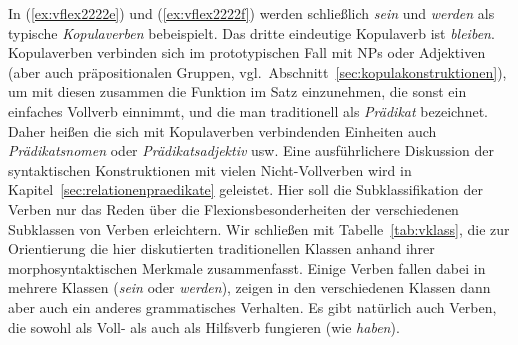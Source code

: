In (\ref{ex:vflex2222e}) und (\ref{ex:vflex2222f}) werden schließlich \textit{sein} und \textit{werden} als typische \textit{Kopulaverben} bebeispielt.
Das dritte eindeutige Kopulaverb ist \textit{bleiben}.
Kopulaverben verbinden sich im prototypischen Fall mit NPs oder Adjektiven (aber auch präpositionalen Gruppen, vgl.\ Abschnitt~\ref{sec:kopulakonstruktionen}), um mit diesen zusammen die Funktion im Satz einzunehmen, die sonst ein einfaches Vollverb einnimmt, und die man traditionell als \textit{Prädikat} bezeichnet.
Daher heißen die sich mit Kopulaverben verbindenden Einheiten auch \textit{Prädikatsnomen} oder \textit{Prädikatsadjektiv} usw.
Eine ausführlichere Diskussion der syntaktischen Konstruktionen mit vielen Nicht-Vollverben wird in Kapitel~\ref{sec:relationenpraedikate} geleistet.
Hier soll die Subklassifikation der Verben nur das Reden über die Flexionsbesonderheiten der verschiedenen Subklassen von Verben erleichtern.
Wir schließen mit Tabelle~\ref{tab:vklass}, die zur Orientierung die hier diskutierten traditionellen Klassen anhand ihrer morphosyntaktischen Merkmale zusammenfasst.
Einige Verben fallen dabei in mehrere Klassen (\zB \textit{sein} oder \textit{werden}), zeigen in den verschiedenen Klassen dann aber auch ein anderes grammatisches Verhalten.
Es gibt natürlich auch Verben, die sowohl als Voll- als auch als Hilfsverb fungieren (wie \textit{haben}).

\begin{table}
  \caption{Traditionelle Verbklassen und ihre Eigenschaften}
  \label{tab:vklass}
\end{table}

